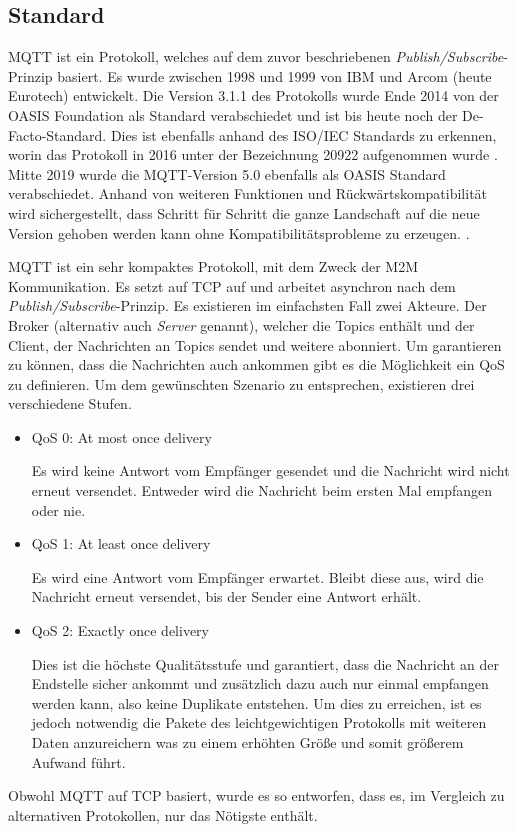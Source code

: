     \subsection{Standard}
        \ac{MQTT} ist ein Protokoll, welches auf dem zuvor beschriebenen \emph{Publish/Subscribe}-Prinzip basiert. Es wurde zwischen 1998 und 1999 von IBM und Arcom (heute Eurotech) entwickelt. Die Version 3.1.1 des Protokolls wurde Ende 2014 von der OASIS Foundation als Standard verabschiedet und ist bis heute noch der De-Facto-Standard. Dies ist ebenfalls anhand des ISO/IEC Standards zu erkennen, worin das Protokoll in 2016 unter der Bezeichnung 20922 aufgenommen wurde \cite{eclipse_foundation2017}. Mitte 2019 wurde die MQTT-Version 5.0 ebenfalls als OASIS Standard verabschiedet. Anhand von weiteren Funktionen und Rückwärtskompatibilität wird sichergestellt, dass Schritt für Schritt die ganze Landschaft auf die neue Version gehoben werden kann ohne Kompatibilitätsprobleme zu erzeugen. \cite{mqtt_org_2019}.
        
        \ac{MQTT} ist ein sehr kompaktes Protokoll, mit dem Zweck der \ac{M2M} Kommunikation.
        Es setzt auf \ac{TCP} auf und arbeitet asynchron nach dem \emph{Publish/Subscribe}-Prinzip. Es existieren im einfachsten Fall zwei Akteure. Der Broker (alternativ auch \emph{Server} genannt), welcher die Topics enthält und der Client, der Nachrichten an Topics sendet und weitere abonniert.
        Um garantieren zu können, dass die Nachrichten auch ankommen gibt es die Möglichkeit ein \ac{QoS} zu definieren. Um dem gewünschten Szenario zu entsprechen, existieren drei verschiedene Stufen. 
        \cite{soni2017survey}
        \begin{itemize}
            \item \glqq QoS 0: At most once delivery\grqq{}
            
            Es wird keine Antwort vom Empfänger gesendet und die Nachricht wird nicht erneut versendet. Entweder wird die Nachricht beim ersten Mal empfangen oder nie.
            \item \glqq QoS 1: At least once delivery\grqq{}
            
            Es wird eine Antwort vom Empfänger erwartet. Bleibt diese aus, wird die Nachricht erneut versendet, bis der Sender eine Antwort erhält.
            \item \glqq QoS 2: Exactly once delivery\grqq{}
            
            Dies ist die höchste Qualitätsstufe und garantiert, dass die Nachricht an der Endstelle sicher ankommt und zusätzlich dazu auch nur einmal empfangen werden kann, also keine Duplikate entstehen. Um dies zu erreichen, ist es jedoch notwendig die Pakete des leichtgewichtigen Protokolls mit weiteren Daten anzureichern was zu einem erhöhten Größe und somit größerem Aufwand führt.
        \end{itemize} \cite{gupta_banks_2015}
        Obwohl \ac{MQTT} auf \ac{TCP} basiert, wurde es so entworfen, dass es, im Vergleich zu alternativen Protokollen, nur das Nötigste enthält. \cite{soni2017survey}

